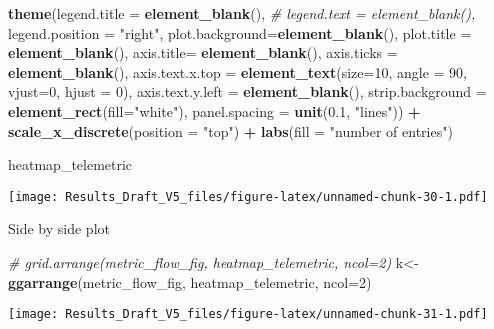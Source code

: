 \documentclass[
]{article}
\newenvironment{Shaded}{\begin{snugshade}}{\end{snugshade}}
\newcommand{\CommentTok}[1]{\textcolor[rgb]{0.56,0.35,0.01}{\textit{#1}}}
\newcommand{\DataTypeTok}[1]{\textcolor[rgb]{0.13,0.29,0.53}{#1}}
\newcommand{\DecValTok}[1]{\textcolor[rgb]{0.00,0.00,0.81}{#1}}
\newcommand{\FloatTok}[1]{\textcolor[rgb]{0.00,0.00,0.81}{#1}}
\newcommand{\KeywordTok}[1]{\textcolor[rgb]{0.13,0.29,0.53}{\textbf{#1}}}
\newcommand{\NormalTok}[1]{#1}
\newcommand{\OperatorTok}[1]{\textcolor[rgb]{0.81,0.36,0.00}{\textbf{#1}}}
\newcommand{\StringTok}[1]{\textcolor[rgb]{0.31,0.60,0.02}{#1}}
\begin{document}
\begin{Shaded}
\begin{Highlighting}[]
\StringTok{                      }\KeywordTok{theme}\NormalTok{(}\DataTypeTok{legend.title =} \KeywordTok{element_blank}\NormalTok{(),}
                      \CommentTok{# legend.text = element_blank(),}
                      \DataTypeTok{legend.position =} \StringTok{"right"}\NormalTok{,}
                      \DataTypeTok{plot.background=}\KeywordTok{element_blank}\NormalTok{(),}
                      \DataTypeTok{plot.title =} \KeywordTok{element_blank}\NormalTok{(),}
                      \DataTypeTok{axis.title=} \KeywordTok{element_blank}\NormalTok{(),}
                      \DataTypeTok{axis.ticks =} \KeywordTok{element_blank}\NormalTok{(),}
                      \DataTypeTok{axis.text.x.top =} \KeywordTok{element_text}\NormalTok{(}\DataTypeTok{size=}\DecValTok{10}\NormalTok{, }\DataTypeTok{angle =} \DecValTok{90}\NormalTok{, }\DataTypeTok{vjust=}\DecValTok{0}\NormalTok{,}
                                                     \DataTypeTok{hjust =} \DecValTok{0}\NormalTok{),}
                      \DataTypeTok{axis.text.y.left =} \KeywordTok{element_blank}\NormalTok{(),}
                      \DataTypeTok{strip.background =} \KeywordTok{element_rect}\NormalTok{(}\DataTypeTok{fill=}\StringTok{"white"}\NormalTok{),}
                      \DataTypeTok{panel.spacing =} \KeywordTok{unit}\NormalTok{(}\FloatTok{0.1}\NormalTok{, }\StringTok{"lines"}\NormalTok{)) }\OperatorTok{+}
\StringTok{                      }\KeywordTok{scale_x_discrete}\NormalTok{(}\DataTypeTok{position =} \StringTok{"top"}\NormalTok{) }\OperatorTok{+}
\StringTok{                      }\KeywordTok{labs}\NormalTok{(}\DataTypeTok{fill =} \StringTok{"number of entries"}\NormalTok{)}

\NormalTok{heatmap_telemetric}
\end{Highlighting}
\end{Shaded}

\texttt{[image: Results\_Draft\_V5\_files/figure-latex/unnamed-chunk-30-1.pdf]}

Side by side plot

\begin{Shaded}
\begin{Highlighting}[]
\CommentTok{# grid.arrange(metric_flow_fig, heatmap_telemetric, ncol=2)}
\NormalTok{k<-}\KeywordTok{ggarrange}\NormalTok{(metric_flow_fig, heatmap_telemetric, }\DataTypeTok{ncol=}\DecValTok{2}\NormalTok{)}
\end{Highlighting}
\end{Shaded}

\texttt{[image: Results\_Draft\_V5\_files/figure-latex/unnamed-chunk-31-1.pdf]}
\end{document}
